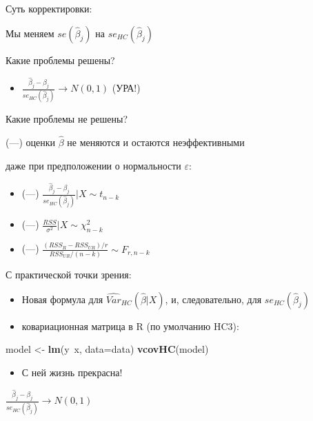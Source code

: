 \documentclass[ignorenonframetext,]{beamer}
\newenvironment{Shaded}{\begin{snugshade}}{\end{snugshade}}
\newcommand{\KeywordTok}[1]{\textcolor[rgb]{0.13,0.29,0.53}{\textbf{{#1}}}}
\newcommand{\DataTypeTok}[1]{\textcolor[rgb]{0.13,0.29,0.53}{{#1}}}
\newcommand{\StringTok}[1]{\textcolor[rgb]{0.31,0.60,0.02}{{#1}}}
\newcommand{\NormalTok}[1]{{#1}}
\begin{document}
\begin{frame}{Суть корректировки:}

Мы меняем \(se(\hat{\beta}_j)\) на \(se_{HC}(\hat{\beta}_j)\)

Какие проблемы решены?

\begin{itemize}
\itemsep1pt\parskip0pt
\item
  \(\frac{\hat{\beta}_j-\beta_j}{se_{HC}(\hat{\beta}_j)} \to N(0,1)\)
  (УРА!)
\end{itemize}

\end{frame}

\begin{frame}{Какие проблемы не решены?}

(---) оценки \(\hat{\beta}\) не меняются и остаются неэффективными

даже при предположении о нормальности \(\varepsilon\):

\begin{itemize}
\item
  (---)
  \(\frac{\hat{\beta}_j-\beta_j}{se_{HC}(\hat{\beta}_j)} | X \sim t_{n-k}\)
\item
  (---) \(\frac{RSS}{\sigma^2} |X \sim \chi^2_{n-k}\)
\item
  (---) \(\frac{(RSS_R-RSS_{UR})/r}{RSS_{UR}/(n-k)} \sim F_{r,n-k}\)
\end{itemize}

\end{frame}

\begin{frame}[fragile]{С практической точки зрения:}

\begin{itemize}
\item
  Новая формула для \(\widehat{Var}_{HC}(\hat{\beta}|X)\), и,
  следовательно, для \(se_{HC}(\hat{\beta}_j)\)
\item
  ковариационная матрица в R (по умолчанию HC3):
\end{itemize}

\begin{Shaded}
\begin{Highlighting}[]
\NormalTok{model <-}\StringTok{ }\KeywordTok{lm}\NormalTok{(y~x, }\DataTypeTok{data=}\NormalTok{data)}
\KeywordTok{vcovHC}\NormalTok{(model)}
\end{Highlighting}
\end{Shaded}

\begin{itemize}
\itemsep1pt\parskip0pt
\item
  С ней жизнь прекрасна!
\end{itemize}

\(\frac{\hat{\beta}_j-\beta_j}{se_{HC}(\hat{\beta}_j)} \to N(0,1)\)

\end{frame}
\end{document}
